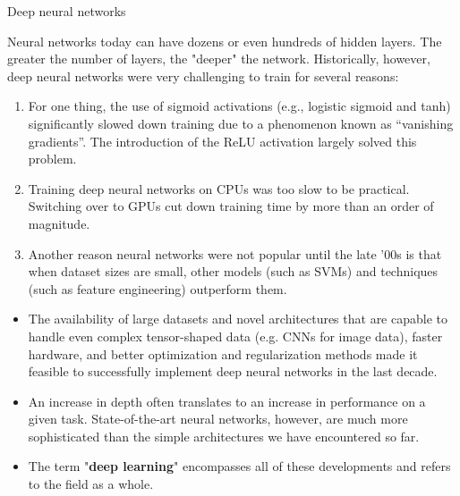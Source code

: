 \begin{vbframe}{Deep neural networks}

Neural networks today can have dozens or even hundreds of hidden layers. The greater the number of layers, the "deeper" the network. Historically, however, deep neural networks were very challenging to train for several reasons:
\lz
\begin{enumerate}
\item For one thing, the use of sigmoid activations (e.g., logistic sigmoid and tanh) significantly slowed down training due to a phenomenon known as \enquote{vanishing gradients}. The introduction of the ReLU activation largely solved this problem.
\item Training deep neural networks on CPUs was too slow to be practical. Switching over to GPUs cut down training time by more than an order of magnitude.
\item Another reason neural networks were not popular until the late '00s is that when dataset sizes are small, other models (such as SVMs) and techniques (such as feature engineering) outperform them. 
\end{enumerate}
\framebreak
\begin{itemize}
\item The availability of large datasets and novel architectures that are capable to handle even complex tensor-shaped data (e.g. CNNs for image data), faster hardware, and better optimization and regularization methods made it feasible to successfully implement deep neural networks in the last decade.
\lz

\item An increase in depth often translates to an increase in performance on a given task. State-of-the-art neural networks, however, are much more sophisticated than the simple architectures we have encountered so far.

\lz
\item The term "\textbf{deep learning}" encompasses all of these developments and refers to the field as a whole.
\end{itemize}
\end{vbframe}

\endlecture
